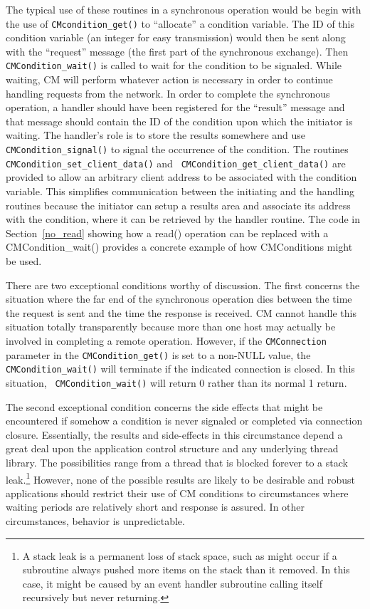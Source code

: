 \documentclass[11pt]{article}
\begin{document}
The typical use of these routines in a synchronous operation would be begin
with the use of {\tt CMcondition\_get()} to ``allocate'' a
condition variable.  The ID of this condition variable (an integer for easy
transmission) would then be sent along with the ``request'' message (the
first part of the synchronous exchange).  Then {\tt CMCondition\_wait()} is
called to wait for the condition to be signaled.  While waiting,
CM will perform whatever action is necessary in order to continue
handling requests from the network.  In order to complete the synchronous
operation, a handler should have been registered for the ``result'' message
and that message should contain the ID of the condition upon which the
initiator is waiting.  The handler's role is to store the results somewhere
and use {\tt CMCondition\_signal()} to signal the occurrence of the
condition.  The routines {\tt CMCondition\_set\_client\_data()} and {\tt
CMCondition\_get\_client\_data()} are provided to allow an arbitrary client
address to be associated with the condition variable.  This simplifies
communication between the initiating and the handling routines because the
initiator can setup a results area and associate its address with the
condition, where it can be retrieved by the handler routine.  The code in
Section~\ref{no_read} showing how a read() operation can be replaced with a
CMCondition\_wait() provides a concrete example of how CMConditions might be
used. 

There are two exceptional conditions worthy of discussion.  The first
concerns the situation where the far end of the synchronous operation dies
between the time the request is sent and the time the response is received.
CM cannot handle this situation totally transparently because more
than one host may actually be involved in completing a remote operation.
However, if the {\tt CMConnection} parameter in the {\tt CMCondition\_get()}
is set to a non-NULL value, the {\tt CMCondition\_wait()} will terminate if
the indicated connection is closed.  In this situation, {\tt
CMCondition\_wait()} will return 0 rather than its normal 1 return.

The second exceptional condition concerns the side effects that might be
encountered if somehow a condition is never signaled or completed via
connection 
closure.  Essentially, the results and side-effects in this circumstance
depend a great deal upon the application control structure and any
underlying thread library.  The possibilities range from a thread that is
blocked forever to a stack leak.\footnote{A stack leak is a permanent loss
of stack space, such as might occur if a subroutine always pushed more items
on the stack than it removed.  In this case, it might be caused by an event
handler subroutine calling itself recursively but never returning.}
However, none of the possible results are likely to be desirable and robust
applications should restrict their use of CM conditions to
circumstances where waiting periods are relatively short and response is
assured.  In other circumstances, behavior is unpredictable.
\end{document}
